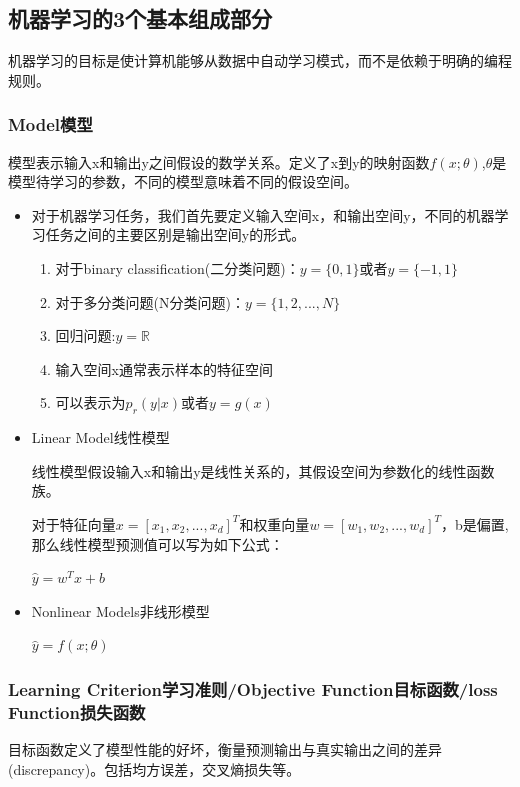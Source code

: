 \documentclass[UTF8]{ctexart}
\begin{document}
\subsection{机器学习的3个基本组成部分}
机器学习的目标是使计算机能够从数据中自动学习模式，而不是依赖于明确的编程规则。

\subsubsection{Model模型}
模型表示输入x和输出y之间假设的数学关系。定义了x到y的映射函数$f(x;\theta)$,$\theta$是模型待学习的参数，不同的模型意味着不同的假设空间。

\begin{itemize}
    \item 对于机器学习任务，我们首先要定义输入空间x，和输出空间y，不同的机器学习任务之间的主要区别是输出空间y的形式。
    \begin{enumerate}
        \item 对于binary classification(二分类问题)：$y=\{0,1\}$或者$y=\{-1,1\}$
        \item 对于多分类问题(N分类问题)：$y=\{1,2,...,N\}$
        \item 回归问题:$y=\mathbb{R} $
        \item 输入空间x通常表示样本的特征空间
        \item 可以表示为$p_r(y|x)$或者$y=g(x)$
    \end{enumerate}
    \item Linear Model线性模型
    
    线性模型假设输入x和输出y是线性关系的，其假设空间为参数化的线性函数族。

    对于特征向量$x=[x_1,x_2,...,x_d]^T$和权重向量$w=[w_1,w_2,...,w_d]^T$，b是偏置,那么线性模型预测值可以写为如下公式：

    $\hat{y}=w^Tx+b$

    \item Nonlinear Models非线形模型
    
    $\hat{y}=f(x;\theta)$

\end{itemize}

\subsubsection{Learning Criterion学习准则/Objective Function目标函数/loss Function损失函数}
目标函数定义了模型性能的好坏，衡量预测输出与真实输出之间的差异(discrepancy)。包括均方误差，交叉熵损失等。
\end{document}
